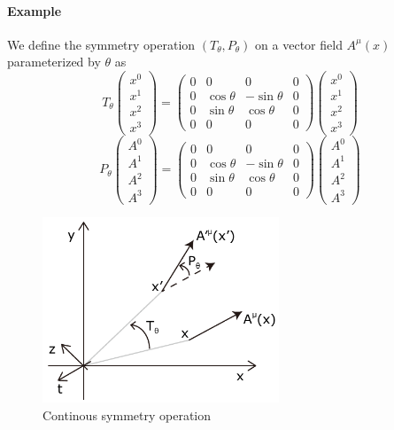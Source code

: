 \documentclass[12pt]{book}
\begin{document}
	\paragraph{Example}We define the symmetry operation $(T_\theta,P_\theta)$ on a vector field $A^\mu(x)$ parameterized by $\theta$ as	
	\begin{equation}
		T_\theta\begin{pmatrix}
		x^0 \\
		x^1\\
		x^2 \\
		x^3
		\end{pmatrix} 
		 =
		\begin{pmatrix}
		0 &0 & 0& 0\\
		0& \cos\theta &-\sin\theta &0 \\
		0&\sin\theta & \cos\theta &0 \\
		0& 0& 0& 0
		\end{pmatrix} 
		\begin{pmatrix}
		x^0 \\
		x^1\\
		x^2 \\
		x^3
		\end{pmatrix} 
	\end{equation}	
	\begin{equation}
		P_\theta \begin{pmatrix}
		A^0 \\
		A^1\\
		A^2 \\
		A^3
		\end{pmatrix} 
		=
		\begin{pmatrix}
		0 &0 & 0& 0\\
		0& \cos\theta &-\sin\theta &0 \\
		0&\sin\theta & \cos\theta &0 \\
		0& 0& 0& 0
		\end{pmatrix} 
		\begin{pmatrix}
		A^0 \\
		A^1\\
		A^2 \\
		A^3
		\end{pmatrix} 
	\end{equation}	

	\begin{figure}[htb]
		\centering  
		\includegraphics[width=200pt]{resources/chap_classical/1_4_symmetry.pdf}
		\caption{Continous symmetry operation}
		\label{fig:symmetry} 
	\end{figure}
	
\end{document}
